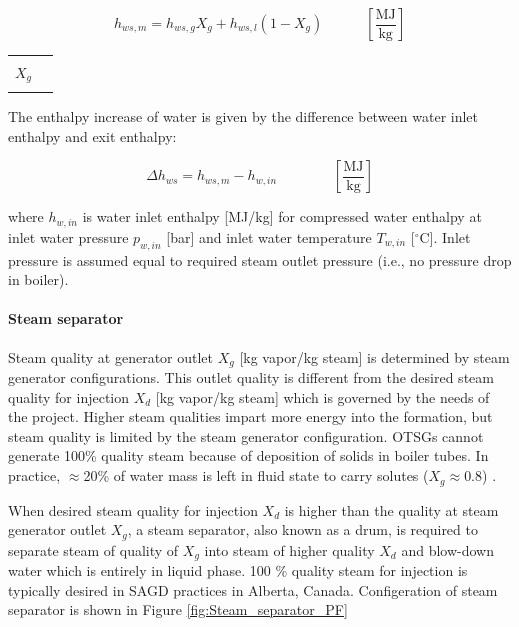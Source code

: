 \documentclass[11pt]{report}
\newcommand{\xlname}[1]{\raisebox{1pt}{\fcolorbox{light-gray}{light-gray}{\texttt{\textcolor{stanford}{\scriptsize{#1}}}}}}
\newcommand{\eqnunitfrac}[2]{\quad\quad \scriptstyle{\left[\frac{\text{#1}}{\text{#2}}\right]}}
\begin{document}
\begin{minipage}{0.6\columnwidth}
\begin{fleqn}[0pt]
\begin{equation}\label{eq:steam_h_mixed}
h_{ws,m} = h_{ws,g}X_{g} + h_{ws,l}(1-X_{g}) \quad\eqnunitfrac{MJ}{kg}
\end{equation}
\end{fleqn}
\end{minipage}\hfill
\begin{minipage}{0.3\columnwidth}
        \begin{tabular}{|cl}
                        & \\
        $X_{g}$       & \xlname{Quality\_generator\_outlet}\\ 
                        & \\
        \end{tabular}
\end{minipage}


The enthalpy increase of water is given by the difference between water inlet enthalpy and exit enthalpy:

\begin{equation}\label{eq:steam_hw}
\Delta h_{ws} = h_{ws,m} - h_{w,in} \quad\quad\eqnunitfrac{MJ}{kg}
\end{equation}

where $h_{w,in}$ is water inlet enthalpy [MJ/kg] for compressed water enthalpy at inlet water pressure $p_{w,in}$ [bar] and inlet water temperature $T_{w,in}$ [$^\circ$C]. Inlet pressure is assumed equal to required steam outlet pressure (i.e., no pressure drop in boiler). 


\paragraph{Steam separator}
Steam quality at generator outlet $X_{g}$ [kg vapor/kg steam] is determined by steam generator configurations. This outlet quality is different from the desired steam quality for injection $X_{d}$ [kg vapor/kg steam] which is governed by the needs of the project. Higher steam qualities impart more energy into the formation, but steam quality is limited by the steam generator configuration. OTSGs cannot generate 100\% quality steam because of deposition of solids in boiler tubes. In practice, $\approx$20\% of water mass is left in fluid state to carry solutes ($X_{g} \approx 0.8$) \cite{Ganapathy2003}. 

When desired steam quality for injection $X_{d}$ is higher than the quality at steam generator outlet $X_{g}$, a steam separator, also known as a drum, is required to separate steam of quality of $X_{g}$ into steam of higher quality $X_{d}$ and blow-down water which is entirely in liquid phase. 100 \% quality steam for injection is typically desired in SAGD practices in Alberta, Canada. Configeration of steam separator is shown in Figure \ref{fig:Steam_separator_PF}
\end{document}
